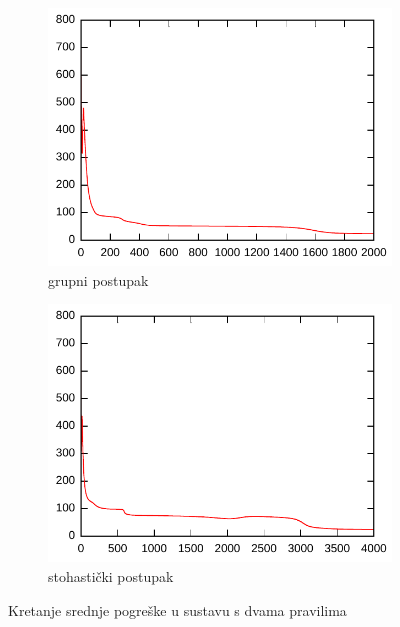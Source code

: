 \documentclass{article}
\begin{document}
\begin{figure}[h]
    \centering
    \begin{subfigure}[b]{0.49\textwidth}
        \centering
        \includegraphics[width=\textwidth]{img/mse-batch-2.pdf}
        \caption{grupni postupak}
    \end{subfigure}
    \hfill
    \begin{subfigure}[b]{0.49\textwidth}
        \centering
        \includegraphics[width=\textwidth]{img/mse-stochastic-2.pdf}
        \caption{stohastički postupak}
    \end{subfigure}
    \hfill
    \caption{Kretanje srednje pogreške u sustavu s dvama pravilima}
    \label{mse-2}
\end{figure}
\end{document}
